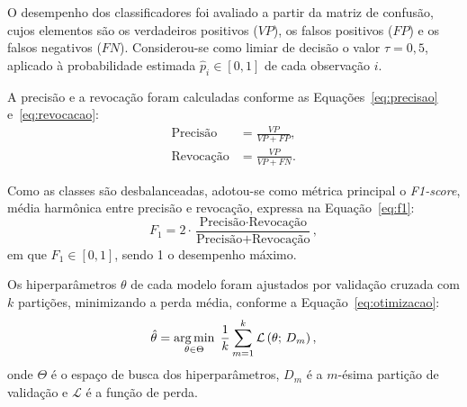 O desempenho dos classificadores foi avaliado a partir da matriz de confusão, cujos elementos são os verdadeiros positivos ($VP$), os falsos positivos ($FP$) e os falsos negativos ($FN$). Considerou-se como limiar de decisão o valor $\tau = 0{,}5$, aplicado à probabilidade estimada $\hat{p}_i \in [0, 1]$ de cada observação $i$.

A precisão e a revocação foram calculadas conforme as Equações~\eqref{eq:precisao} e~\eqref{eq:revocacao}:
\begin{align}
  \text{Precisão}  & = \frac{VP}{VP + FP}, \label{eq:precisao}  \\
  \text{Revocação} & = \frac{VP}{VP + FN}. \label{eq:revocacao}
\end{align}

Como as classes são desbalanceadas, adotou-se como métrica principal o \textit{F1-score}, média harmônica entre precisão e revocação, expressa na Equação~\eqref{eq:f1}:
\begin{equation}
  F_1 = 2 \cdot \frac{\text{Precisão} \cdot \text{Revocação}}{\text{Precisão} + \text{Revocação}},
  \label{eq:f1}
\end{equation}
em que $F_1 \in [0, 1]$, sendo 1 o desempenho máximo.

Os hiperparâmetros $\theta$ de cada modelo foram ajustados por validação cruzada com $k$ partições, minimizando a perda média, conforme a Equação~\eqref{eq:otimizacao}:
\begin{equation}
  \hat{\theta} = \operatorname*{arg\,min}_{\theta \in \Theta} \; \frac{1}{k} \sum_{m=1}^{k} \mathcal{L}\left(\theta;\, D_m\right),
  \label{eq:otimizacao}
\end{equation}
onde $\Theta$ é o espaço de busca dos hiperparâmetros, $D_m$ é a $m$-ésima partição de validação e $\mathcal{L}$ é a função de perda.

